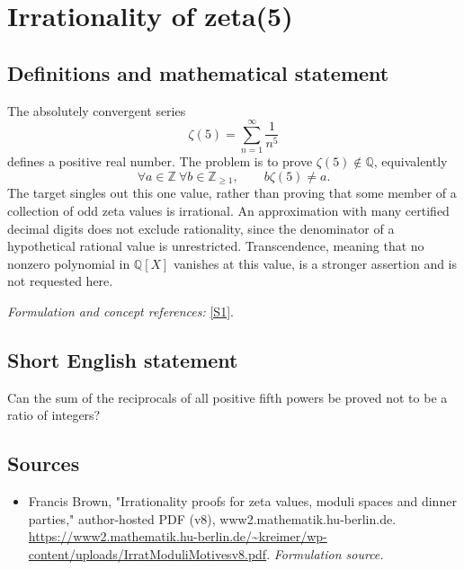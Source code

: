 \documentclass[11pt]{article}
\begin{document}
\section*{\texorpdfstring{Irrationality of zeta(5)}{Irrationality of zeta(5)}}\label{30006861}
\subsection{Definitions and mathematical statement}
The absolutely convergent series
\[
 \zeta(5)=\sum_{n=1}^{\infty}\frac1{n^5}
\]
defines a positive real number. The problem is to prove $\zeta(5)\notin{\mathbb{Q}}$, equivalently
\[
 \forall a\in{\mathbb{Z}}\ \forall b\in{\mathbb{Z}}_{\ge1},\qquad b\zeta(5)\ne a.
\]
The target singles out this one value, rather than proving that some member of a collection of odd zeta values is irrational. An approximation with many certified decimal digits does not exclude rationality, since the denominator of a hypothetical rational value is unrestricted. Transcendence, meaning that no nonzero polynomial in ${\mathbb{Q}}[X]$ vanishes at this value, is a stronger assertion and is not requested here.
\par\smallskip\textit{Formulation and concept references:} \href{https://www2.mathematik.hu-berlin.de/~kreimer/wp-content/uploads/IrratModuliMotivesv8.pdf}{[S1]}.

\subsection{Short English statement}
Can the sum of the reciprocals of all positive fifth powers be proved not to be a ratio of integers?
\subsection{Sources}
\begin{itemize}
\item[S1]Francis Brown, "Irrationality proofs for zeta values, moduli spaces and dinner parties," author-hosted PDF (v8), www2.mathematik.hu-berlin.de.
\url{https://www2.mathematik.hu-berlin.de/~kreimer/wp-content/uploads/IrratModuliMotivesv8.pdf}.
\textit{Formulation source.}
\end{itemize}
\end{document}
